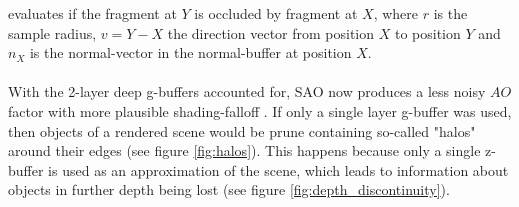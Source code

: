 \documentclass{ACGSeminar}
\begin{document}
		evaluates if the fragment at $Y$ is occluded by fragment at $X$, where $r$ is the sample radius, $v = Y - X$ the direction vector from position $X$ to position $Y$ and $n_X$ is the normal-vector in the normal-buffer at position $X$. \\\\
		With the 2-layer deep g-buffers accounted for, SAO now produces a less noisy $AO$ factor with more plausible shading-falloff \cite{Mara2016DeepGBuffer}. If only a single layer g-buffer was used, then objects of a rendered scene would be prune containing so-called "halos" around their edges (see figure \ref{fig:halos}). This happens because only a single z-buffer is used as an approximation of the scene, which leads to information about objects in further depth being lost (see figure \ref{fig:depth_discontinuity}).
		
\end{document}
